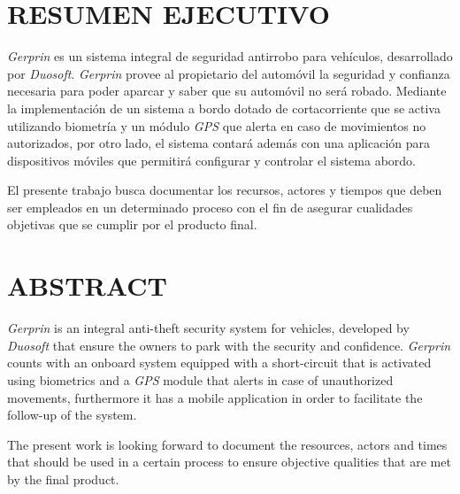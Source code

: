 \section*{RESUMEN EJECUTIVO}

\emph{Gerprin} es un sistema integral de seguridad antirrobo para vehículos, desarrollado por \emph{Duosoft}. \emph{Gerprin} provee al propietario del automóvil la seguridad y confianza necesaria para poder aparcar y saber que su automóvil no será robado. Mediante la implementación de un sistema a bordo dotado de cortacorriente que se activa utilizando biometría y un módulo \emph{GPS} que alerta en caso de movimientos no autorizados, por otro lado, el sistema contará además con una aplicación para dispositivos móviles que permitirá configurar y controlar el sistema abordo.

El presente trabajo busca documentar los recursos, actores y tiempos que deben ser empleados en un determinado proceso con el fin de asegurar cualidades objetivas que se cumplir por el producto final.

\section*{ABSTRACT}

\emph{Gerprin} is an integral anti-theft security system for vehicles, developed by \emph{Duosoft} that ensure the owners to park with the security and confidence. \emph{Gerprin} counts with an onboard system equipped with a short-circuit that is activated using biometrics and a \emph{GPS} module that alerts in case of unauthorized movements, furthermore  it has a mobile application in order to facilitate the follow-up of the system.

The present work is looking forward to document the resources, actors and times that should be used in a certain process to ensure objective qualities that are met by the final product.


